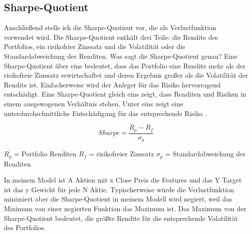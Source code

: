 \documentclass[12pt]{article}
\begin{document}
        \subsection{Sharpe-Quotient}

            Anschließend stelle ich die Sharpe-Quotient vor, die als Verlustfunktion verwendet wird. 
            Die Sharpe-Quotient enthält drei Teile: die Rendite des Portfolios, 
            ein risikofrier Zinssatz und die Volatilität oder die Standardabweichung der Renditen. 
            Was sagt die Sharpe-Quotient genau? Eine Sharpe-Quotient über eins bedeutet, 
            dass das Portfolio eine Rendite mehr als der risikofreie Zinssatz erwirtschaftet und 
            deren Ergebnis großer als die Volatilität der Rendite ist. 
            Einfacherweise wird der Anleger für das Risiko hervorragend entschädigt. 
            Eine Sharpe-Quotient gleich eins zeigt, dass Renditen und Risiken in einem ausgewogenen Verhältnis stehen. 
            Unter eins zeigt eine unterdurchschnittliche Entschädigung für das entsprechende Risiko \cite{sharpe1994}.

            \begin{multicols}{2}
                
                \begin{Large} \[ Sharpe = \frac{R_p - R_f}{\sigma_p} \] \end{Large}

                \vfill

                \begin{small}

                    \noindent $R_p$ = Portfolio Renditen \newline 
                    $R_f$ = risikofreier Zinssatz \newline 
                    $\sigma_p$ = Standardabweichung der Renditen 

                \end{small}

            \end{multicols}

            In meinem Model ist A Aktien mit x Close Preis die Features und das Y Target ist das y Gewicht für jede N Aktie. 
            Typischerweise würde die Verlustfunktion minimiert aber die Sharpe-Quotient in meinem Modell wird negiert, 
            weil das Minimum von einer negierten Funktion das Maximum ist. Das Maximum von der Sharpe-Quotient bedeutet, 
            die größte Rendite für die entsprechende Volatilität des Portfolios.
\end{document}

